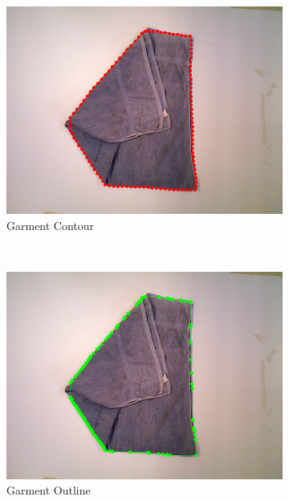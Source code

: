 \begin{figure}[htbp]
	\centering
    \begin{subfigure}[l]{0.49\textwidth}
	    \centering
    	\includegraphics[width=\textwidth]
    	{figures/polygon-contour-01.png}
    	\caption{Garment Contour}
	\end{subfigure}
	~
    \begin{subfigure}[c]{0.49\textwidth}
	    \centering
    	\includegraphics[width=\textwidth]
    	{figures/polygon-outline-01.png}
    	\caption{Garment Outline}
	\end{subfigure}
	~
    \begin{subfigure}[r]{0.49\textwidth}
	    \centering

\end{subfigure}
\end{figure}
